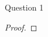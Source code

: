 \begin{solution}{Question 1}
	\begin{question}
	\end{question}
	\tcblower
	\begin{proof}
	\end{proof}
\end{solution}
